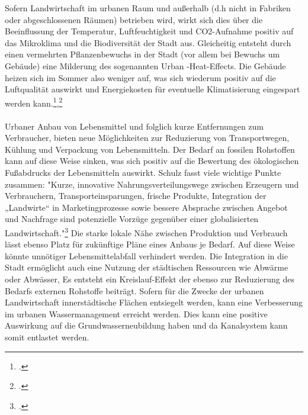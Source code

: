 \documentclass{scrartcl}
\begin{document}
Sofern Landwirtschaft im urbanen Raum und außerhalb (d.h nicht in Fabriken oder abgeschlossenen Räumen) betrieben wird, wirkt sich dies über die Beeinflussung der Temperatur, Luftfeuchtigkeit und CO2-Aufnahme positiv auf das Mikroklima und die Biodiversität der Stadt aus.
Gleicheitig entsteht durch einen vermehrten Pflanzenbewuchs in der Stadt (vor allem bei Bewuchs um Gebäude) eine Milderung des sogenannten Urban -Heat-Effects. Die Gebäude heizen sich im Sommer also weniger auf, was sich wiederum positiv auf die Luftqualität auswirkt und Energiekosten für eventuelle Klimatisierung eingespart werden kann.\footcite{Schulz2013UrbaneLandmanagements},\footcite[Vgl.][S.16]{TobiasSpringDerBasel-Stadt}
\\
\\
Urbaner Anbau von Lebensmittel und folglich kurze Entfernungen zum Verbraucher, bieten neue Möglichkeiten zur Reduzierung von Transportwegen, Kühlung und Verpackung von Lebensmitteln. Der Bedarf an fossilen Rohstoffen kann auf diese Weise sinken, was sich positiv auf die Bewertung des ökologischen Fußabdrucks der Lebensmitteln auswirkt. Schulz fasst viele wichtige Punkte zusammen: "Kurze, innovative Nahrungsverteilungswege zwischen Erzeugern und Verbrauchern, Transporteinsparungen, frische Produkte, Integration der „Landwirte“ in Marketingprozesse sowie bessere Absprache zwischen Angebot und Nachfrage sind potenzielle Vorzüge gegenüber einer globalisierten Landwirtschaft."\footcite[S.10]{Schulz2013UrbaneLandmanagements} Die starke lokale Nähe zwischen Produktion und Verbrauch lässt ebenso Platz für zukünftige Pläne eines Anbaus je Bedarf. Auf diese Weise könnte unnötiger Lebensmittelabfall verhindert werden. Die Integration in die Stadt ermöglicht auch eine Nutzung der städtischen Ressourcen wie Abwärme oder Abwässer, Es entsteht ein Kreislauf-Effekt der ebenso zur Reduzierung des Bedarfs externen Rohstoffe beiträgt.
Sofern für die Zwecke der urbanen Landwirtschaft innerstädtische Flächen entsiegelt werden, kann eine Verbesserung im urbanen Wassermanagement erreicht werden. Dies kann eine positive Auswirkung auf die Grundwasserneubildung haben und da Kanalsystem kann somit entlastet werden.  
  
\end{document}
